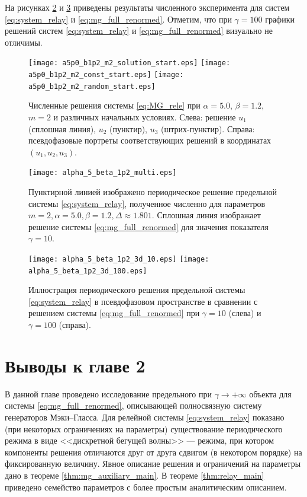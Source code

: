На рисунках \ref{fig:solution_2d} и \ref{fig:solution_3d} приведены результаты численного эксперимента для систем \eqref{eq:system_relay} и \eqref{eq:mg_full_renormed}. Отметим, что при $\gamma=100$ графики решений систем \eqref{eq:system_relay} и \eqref{eq:mg_full_renormed} визуально не отличимы.


\begin{figure}[!ht]
	\centering
	\texttt{[image: a5p0\_b1p2\_m2\_solution\_start.eps]}
	\texttt{[image: a5p0\_b1p2\_m2\_const\_start.eps]}
	\texttt{[image: a5p0\_b1p2\_m2\_random\_start.eps]}
	\caption{Численные решения системы \eqref{eq:MG_rele} при  $\alpha = 5.0$, $\beta = 1.2$, $m = 2$ и различных начальных условиях. Слева: решение $u_1$ (сплошная линия), $u_2$ (пунктир), $u_3$ (штрих-пунктир). Справа: псевдофазовые портреты соответствующих решений в координатах $(u_1, u_2, u_3)$.}
	\label{fig:periodic_solution}
\end{figure}

\begin{figure}
	\centering
	\texttt{[image: alpha\_5\_beta\_1p2\_multi.eps]}
	\caption{Пунктирной линией изображено периодическое решение предельной системы  \eqref{eq:system_relay}, полученное численно для параметров $m = 2, \alpha = 5.0, \beta = 1.2, \Delta \approx 1.801$. Сплошная линия изображает решение системы \eqref{eq:mg_full_renormed} для значения показателя $\gamma = 10$.}
	\label{fig:solution_2d}
\end{figure}

\begin{figure}
	\centering
	\texttt{[image: alpha\_5\_beta\_1p2\_3d\_10.eps]}\hfill
	\texttt{[image: alpha\_5\_beta\_1p2\_3d\_100.eps]}
	\caption{Иллюстрация периодического решения предельной системы \eqref{eq:system_relay} в псевдофазовом пространстве в сравнении с решением системы \eqref{eq:mg_full_renormed} при $\gamma = 10$ (слева) и $\gamma = 100$ (справа).}
	\label{fig:solution_3d}
\end{figure}


\section{Выводы к главе 2}\label{sec:ch2/sect5}

В данной главе проведено исследование предельного при $\gamma \to +\infty$ объекта для системы \eqref{eq:mg_full_renormed}, описывающей полносвязную систему генераторов Мэки--Гласса. Для релейной системы \eqref{eq:system_relay} показано (при некоторых ограничениях на параметры) существование периодического режима в виде <<дискретной бегущей волны>> --- режима, при котором компоненты решения отличаются друг от друга сдвигом (в некотором порядке) на фиксированную величину. Явное описание решения и ограничений на параметры дано в теореме \ref{thm:mg_auxiliary_main}. В теореме \ref{thm:relay_main} приведено семейство параметров с более простым аналитическим описанием.
